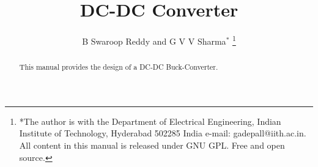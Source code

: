 \documentclass[journal,12pt,twocolumn]{IEEEtran}
\begin{document}









\def\putbox#1#2#3{\makebox[0in][l]{\makebox[#1][l]{}\raisebox{\baselineskip}[0in][0in]{\raisebox{#2}[0in][0in]{#3}}}}
     \def\rightbox#1{\makebox[0in][r]{#1}}
     \def\centbox#1{\makebox[0in]{#1}}
     \def\topbox#1{\raisebox{-\baselineskip}[0in][0in]{#1}}
     \def\midbox#1{\raisebox{-0.5\baselineskip}[0in][0in]{#1}}

\vspace{3cm}

\title{ 
DC-DC Converter
}

\author{B Swaroop Reddy and  G V V Sharma$^{*}$%
	\thanks{*The author is with the Department
		of Electrical Engineering, Indian Institute of Technology, Hyderabad
		502285 India e-mail:  gadepall@iith.ac.in. All content in this manual is released under GNU GPL.  Free and open source.}
	
}	

\maketitle

\tableofcontents
\bigskip

\begin{abstract}
	
	This manual provides the design of a DC-DC Buck-Converter.
	
\end{abstract}

\end{document}
